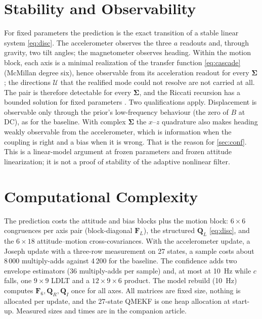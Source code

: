 \documentclass[conference]{IEEEtran}
\DeclareRobustCommand{\mat}[1]{\bm{#1}}
\theoremstyle{bodysmall}
\begin{document}
\section{Stability and Observability}
For fixed parameters the prediction is the exact transition of a stable
linear system \eqref{eq:disc}. The accelerometer observes
the three $a$ readouts and, through gravity, two tilt angles; the
magnetometer observes heading. Within the motion block, each axis is a
minimal realization of the transfer function \eqref{eq:cascade}
(McMillan degree six), hence observable from its acceleration readout for
every $\mat\Sigma$; the directions $\mathcal U$ that the realified mode could
not resolve are not carried at all. The pair is therefore detectable for
every $\mat\Sigma$, and the Riccati recursion has a bounded solution for fixed
parameters \cite{andersonmoore79}. Two
qualifications apply. Displacement is observable only through the prior's
low-frequency behaviour (the zero of $B$ at DC), as for the baseline. With
complex $\mat\Sigma$ the $x$--$z$ quadrature also makes heading weakly
observable from the accelerometer, which is information when the coupling is
right and a bias when it is wrong. That is the reason for \cref{sec:conf}.
This is a linear-model argument at frozen parameters and frozen attitude
linearization; it is not a proof of stability of the adaptive nonlinear
filter.

\section{Computational Complexity}
The prediction costs the attitude and bias blocks plus the motion block:
$6\times6$ congruences per axis pair (block-diagonal $\mat F_L$), the
structured $\mat Q_L$ \eqref{eq:disc}, and the $6\times18$ attitude--motion
cross-covariances. With the accelerometer update, a Joseph update with a
three-row measurement on 27 states, a sample costs about 8\,000
multiply-adds against 4\,200 for the baseline. The confidence adds two envelope estimators
(36 multiply-adds per sample) and, at most at \SI{10}{Hz} while $c$ falls, one
$9\times9$ LDLT and a $12\times9\times6$ product. The model rebuild
(\SI{10}{Hz}) computes $\mat F_6,\mat Q_R,\mat Q_I$ once for all axes. All
matrices are fixed size, nothing is allocated per update, and the 27-state
QMEKF is one heap allocation at start-up. Measured sizes and times are in the
companion article.
\end{document}
